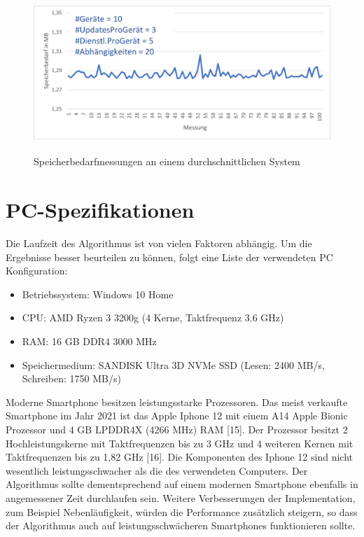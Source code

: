\begin{figure}[h]
\begin{center}
\includegraphics[width=14cm,height=6cm]{"images/Speicherverbrauch"}
\caption{Speicherbedarfmessungen an einem durchschnittlichen System}
\label{fig:Prob1:MEA}
\end{center}
\end{figure}

\section{PC-Spezifikationen}
Die Laufzeit des Algorithmus ist von vielen Faktoren abhängig. Um die Ergebnisse besser beurteilen zu können, folgt eine Liste der verwendeten
PC Konfiguration:
\begin{itemize}
\item Betriebssystem: Windows 10 Home 
\item CPU: AMD Ryzen 3 3200g (4 Kerne, Taktfrequenz 3.6 GHz) 
\item RAM: 16 GB DDR4 3000 MHz
\item Speichermedium: SANDISK Ultra 3D NVMe SSD (Lesen: 2400 MB/s, Schreiben: 1750 MB/s)
\end{itemize}

Moderne Smartphone besitzen leistungsstarke Prozessoren. Das meist verkaufte Smartphone im Jahr 2021 ist das Apple Iphone 12 mit einem
A14 Apple Bionic Prozessor und 4 GB LPDDR4X (4266 MHz) RAM [15]. Der Prozessor besitzt 2 Hochleistungskerne mit Taktfrequenzen bis zu 3 GHz und
4 weiteren Kernen mit Taktfrequenzen bis zu 1,82 GHz [16]. Die Komponenten des Iphone 12 sind nicht wesentlich leistungsschwacher als die des
verwendeten Computers. Der Algorithmus sollte dementsprechend auf einem modernen Smartphone ebenfalls in angemessener Zeit durchlaufen sein.
Weitere Verbesserungen der Implementation, zum Beispiel Nebenläufigkeit, würden die Performance zusätzlich steigern, so dass der Algorithmus auch
auf leistungsschwächeren Smartphones funktionieren sollte. 



